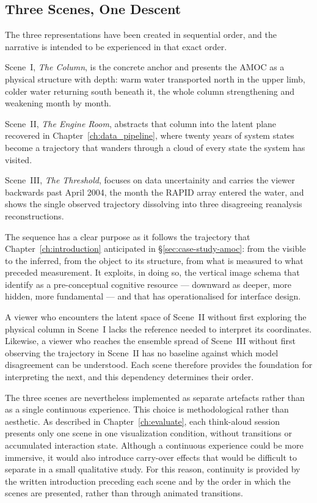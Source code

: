\subsection{Three Scenes, One Descent}
\label{subsec:three-scenes}

The three representations have been created in sequential order, and the narrative is intended to be experienced in that exact order.

Scene~I, \emph{The Column}, is the concrete anchor and presents the AMOC as a physical structure with depth: warm water transported north in the upper limb, colder water returning south beneath it, the whole column strengthening and weakening month by month.

Scene~II, \emph{The Engine Room}, abstracts that column into the latent plane recovered in Chapter~\ref{ch:data_pipeline}, where twenty years of system states become a trajectory that wanders through a cloud of every state the system has visited. 

Scene~III, \emph{The Threshold}, focuses on data uncertainity and carries the viewer backwards past April 2004, the month the RAPID array entered the water, and shows the single observed trajectory dissolving into three disagreeing reanalysis reconstructions.

The sequence has a clear purpose as it follows the trajectory that Chapter~\ref{ch:introduction} anticipated in §\ref{sec:case-study-amoc}: from the visible to the inferred, from the object to its structure, from what is measured to what preceded measurement. It exploits, in doing so, the vertical image schema that \citet{lakoff1999} identify as a pre-conceptual cognitive resource --- downward as deeper, more hidden, more fundamental --- and that \citet{baur2026} has operationalised for interface design. 

A viewer who encounters the latent space of Scene~II without first exploring the physical column in Scene~I lacks the reference needed to interpret its coordinates. Likewise, a viewer who reaches the ensemble spread of Scene~III without first observing the trajectory in Scene~II has no baseline against which model disagreement can be understood. Each scene therefore provides the foundation for interpreting the next, and this dependency determines their order.

The three scenes are nevertheless implemented as separate artefacts rather than as a single continuous experience. This choice is methodological rather than aesthetic. As described in Chapter~\ref{ch:evaluate}, each think-aloud session presents only one scene in one visualization condition, without transitions or accumulated interaction state. Although a continuous experience could be more immersive, it would also introduce carry-over effects that would be difficult to separate in a small qualitative study. For this reason, continuity is provided by the written introduction preceding each scene and by the order in which the scenes are presented, rather than through animated transitions.

